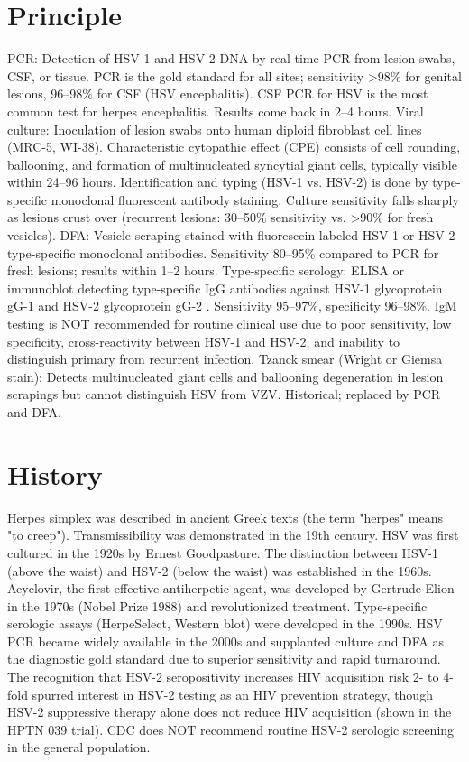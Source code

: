 \section*{Principle}
PCR: Detection of HSV-1 and HSV-2 DNA by real-time PCR from lesion swabs, CSF, or tissue. PCR is the gold standard for all sites; sensitivity >98\% for genital lesions, 96--98\% for CSF (HSV encephalitis). CSF PCR for HSV is the most common test for herpes encephalitis. Results come back in 2--4 hours. Viral culture: Inoculation of lesion swabs onto human diploid fibroblast cell lines (MRC-5, WI-38). Characteristic cytopathic effect (CPE) consists of cell rounding, ballooning, and formation of multinucleated syncytial giant cells, typically visible within 24--96 hours. Identification and typing (HSV-1 vs. HSV-2) is done by type-specific monoclonal fluorescent antibody staining. Culture sensitivity falls sharply as lesions crust over (recurrent lesions: 30--50\% sensitivity vs. >90\% for fresh vesicles). DFA: Vesicle scraping stained with fluorescein-labeled HSV-1 or HSV-2 type-specific monoclonal antibodies. Sensitivity 80--95\% compared to PCR for fresh lesions; results within 1--2 hours. Type-specific serology: ELISA or immunoblot detecting type-specific IgG antibodies against HSV-1 glycoprotein gG-1 and HSV-2 glycoprotein gG-2 \cite{wald2002serological}. Sensitivity 95--97\%, specificity 96--98\%. IgM testing is NOT recommended for routine clinical use due to poor sensitivity, low specificity, cross-reactivity between HSV-1 and HSV-2, and inability to distinguish primary from recurrent infection. Tzanck smear (Wright or Giemsa stain): Detects multinucleated giant cells and ballooning degeneration in lesion scrapings but cannot distinguish HSV from VZV. Historical; replaced by PCR and DFA.

\section*{History}
Herpes simplex was described in ancient Greek texts (the term "herpes" means "to creep"). Transmissibility was demonstrated in the 19th century. HSV was first cultured in the 1920s by Ernest Goodpasture. The distinction between HSV-1 (above the waist) and HSV-2 (below the waist) was established in the 1960s. Acyclovir, the first effective antiherpetic agent, was developed by Gertrude Elion in the 1970s (Nobel Prize 1988) and revolutionized treatment. Type-specific serologic assays (HerpeSelect, Western blot) were developed in the 1990s. HSV PCR became widely available in the 2000s and supplanted culture and DFA as the diagnostic gold standard due to superior sensitivity and rapid turnaround. The recognition that HSV-2 seropositivity increases HIV acquisition risk 2- to 4-fold spurred interest in HSV-2 testing as an HIV prevention strategy, though HSV-2 suppressive therapy alone does not reduce HIV acquisition (shown in the HPTN 039 trial). CDC does NOT recommend routine HSV-2 serologic screening in the general population.

